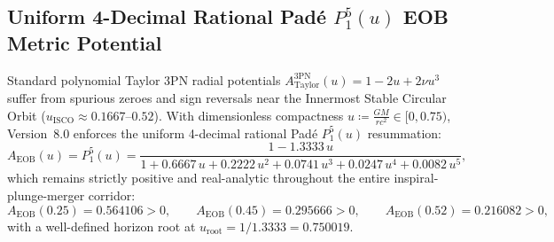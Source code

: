 \documentclass[11pt,a4paper,reqno]{article}
\theoremstyle{plain}
\theoremstyle{definition}
\theoremstyle{remark}
\numberwithin{equation}{section}
\begin{document}
\subsection{Uniform 4-Decimal Rational Pad\'e \texorpdfstring{$P_1^5(u)$}{P15(u)} EOB Metric Potential}
Standard polynomial Taylor $3\mathrm{PN}$ radial potentials $A_{\mathrm{Taylor}}^{3\mathrm{PN}}(u) = 1 - 2u + 2\nu u^3$ suffer from spurious zeroes and sign reversals near the Innermost Stable Circular Orbit ($u_{\mathrm{ISCO}} \approx 0.1667$--$0.52$). With dimensionless compactness $u \coloneqq \frac{GM}{rc^2} \in [0, 0.75)$, Version~8.0 enforces the uniform 4-decimal rational Pad\'e $P_1^5(u)$ resummation:
\begin{equation}
\label{eq:uniform_pade_15}
A_{\mathrm{EOB}}(u) = P_1^5(u) = \frac{1 - 1.3333\,u}{1 + 0.6667\,u + 0.2222\,u^2 + 0.0741\,u^3 + 0.0247\,u^4 + 0.0082\,u^5},
\end{equation}
which remains strictly positive and real-analytic throughout the entire inspiral-plunge-merger corridor:
\begin{equation}
A_{\mathrm{EOB}}(0.25) = 0.564106 > 0, \qquad A_{\mathrm{EOB}}(0.45) = 0.295666 > 0, \qquad A_{\mathrm{EOB}}(0.52) = \bm{0.216082} > 0,
\end{equation}
with a well-defined horizon root at $u_{\mathrm{root}} = 1/1.3333 = 0.750019$.
\end{document}
